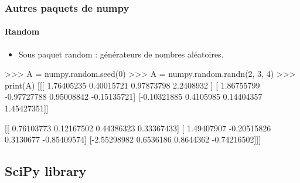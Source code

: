 \begin{frame}[fragile]
\frametitle{Autres paquets de numpy}
\framesubtitle{Random}
\begin{itemize}
 \item Sous paquet random : générateurs de nombres aléatoires. 
\end{itemize}
\begin{pythonConsole}
>>> A = numpy.random.seed(0)
>>> A = numpy.random.randn(2, 3, 4)
>>> print(A)
[[[ 1.76405235  0.40015721  0.97873798  2.2408932 ]
  [ 1.86755799 -0.97727788  0.95008842 -0.15135721]
  [-0.10321885  0.4105985   0.14404357  1.45427351]]

 [[ 0.76103773  0.12167502  0.44386323  0.33367433]
  [ 1.49407907 -0.20515826  0.3130677  -0.85409574]
  [-2.55298982  0.6536186   0.8644362  -0.74216502]]]
\end{pythonConsole}
\end{frame}
\subsection{SciPy library}
